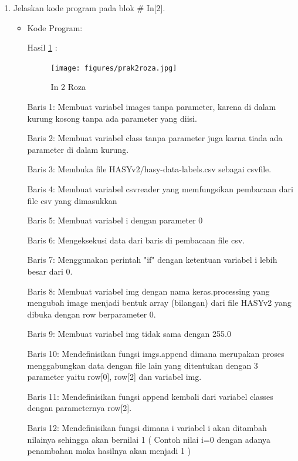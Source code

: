 \begin{enumerate}
\item Jelaskan kode program pada blok \# In[2].
\begin{itemize}
\item Kode Program:

\par Hasil \ref{in2roza} :
\begin{figure}[!hbtp]
\centering
\texttt{[image: figures/prak2roza.jpg]}
\caption{In 2 Roza}
\label{in2roza}
\end{figure}
\par Baris 1: Membuat variabel images tanpa parameter, karena di dalam kurung kosong tanpa ada parameter yang diisi.
\par Baris 2: Membuat variabel class tanpa parameter juga karna tiada ada parameter di dalam kurung.
\par Baris 3: Membuka file HASYv2/hasy-data-labels.csv sebagai csvfile.
\par Baris 4: Membuat variabel csvreader yang memfungsikan pembacaan dari file csv yang dimasukkan
\par Baris 5: Membuat variabel i dengan parameter 0
\par Baris 6: Mengeksekusi data dari baris di pembacaan file csv.
\par Baris 7: Menggunakan perintah "if" dengan ketentuan variabel i lebih besar dari  0.
\par Baris 8: Membuat variabel img dengan nama keras.processing yang mengubah image menjadi bentuk array (bilangan) dari file HASYv2 yang dibuka dengan row berparameter 0.
\par Baris 9: Membuat variabel img tidak sama dengan 255.0
\par Baris 10: Mendefinisikan fungsi imgs.append dimana merupakan proses menggabungkan data dengan file lain  yang ditentukan dengan 3 parameter yaitu row[0], row[2] dan variabel img.
\par Baris 11: Mendefinisikan fungsi append kembali dari variabel classes dengan parameternya row[2].
\par Baris 12: Mendefinisikan fungsi dimana i variabel i akan ditambah nilainya sehingga akan bernilai 1 ( Contoh nilai i=0 dengan adanya penambahan maka hasilnya akan menjadi 1 )
\end{itemize}
\par



\end{enumerate}

